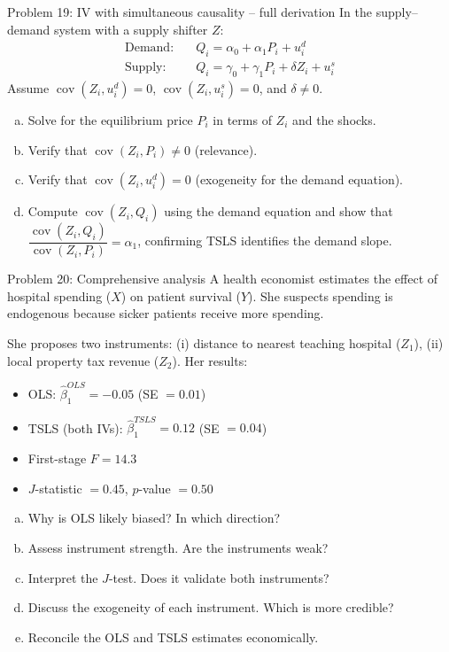 \documentclass[10pt]{beamer}
\begin{document}
\begin{frame}{Problem 19: IV with simultaneous causality -- full derivation}
\label{q19}
In the supply--demand system with a supply shifter $Z$:
\begin{align*}
\text{Demand}: & \quad Q_i = \alpha_0 + \alpha_1 P_i + u_i^d \\
\text{Supply}: & \quad Q_i = \gamma_0 + \gamma_1 P_i + \delta Z_i + u_i^s
\end{align*}
Assume $\operatorname{cov}(Z_i, u_i^d) = 0$, $\operatorname{cov}(Z_i, u_i^s) = 0$, and $\delta \neq 0$.

\begin{enumerate}[(a)]
  \item Solve for the equilibrium price $P_i$ in terms of $Z_i$ and the shocks.
  \item Verify that $\operatorname{cov}(Z_i, P_i) \neq 0$ (relevance).
  \item Verify that $\operatorname{cov}(Z_i, u_i^d) = 0$ (exogeneity for the demand equation).
  \item Compute $\operatorname{cov}(Z_i, Q_i)$ using the demand equation and show that $\dfrac{\operatorname{cov}(Z_i, Q_i)}{\operatorname{cov}(Z_i, P_i)} = \alpha_1$, confirming TSLS identifies the demand slope.
\end{enumerate}

\vfill
\hfill\hyperlink{s19}{}
\end{frame}

\begin{frame}{Problem 20: Comprehensive analysis}
\label{q20}
A health economist estimates the effect of hospital spending ($X$) on patient survival ($Y$). She suspects spending is endogenous because sicker patients receive more spending.

She proposes two instruments: (i) distance to nearest teaching hospital ($Z_1$), (ii) local property tax revenue ($Z_2$). Her results:
\begin{itemize}
  \item OLS: $\widehat{\beta}_1^{OLS} = -0.05$ (SE $= 0.01$)
  \item TSLS (both IVs): $\widehat{\beta}_1^{TSLS} = 0.12$ (SE $= 0.04$)
  \item First-stage $F = 14.3$
  \item $J$-statistic $= 0.45$, $p$-value $= 0.50$
\end{itemize}

\begin{enumerate}[(a)]
  \item Why is OLS likely biased? In which direction?
  \item Assess instrument strength. Are the instruments weak?
  \item Interpret the $J$-test. Does it validate both instruments?
  \item Discuss the exogeneity of each instrument. Which is more credible?
  \item Reconcile the OLS and TSLS estimates economically.
\end{enumerate}

\vfill
\hfill\hyperlink{s20}{}
\end{frame}
\end{document}
